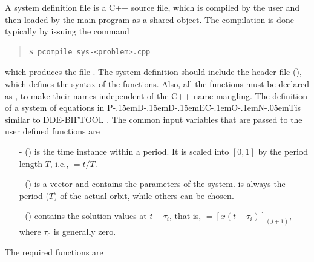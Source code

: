 \documentclass[10pt,a4paper]{ddedoc}
\def\pdde{{P\kern-.15emD\kern-.15emD\kern-.15emE\raisebox{.25ex}{-}C\kern-.1emO\kern-.1emN\kern-.05emT}}
\begin{document}
A system definition file is a C++ source file, which is compiled by the user
and then loaded by the main program  as a shared object. The compilation is
done typically by issuing the command
{ \small \begin{quote} \begin{lstlisting}[basicstyle=\tt,frame=single]
$ pcompile sys-<problem>.cpp
\end{lstlisting} \end{quote} } \noindent
which produces the file .
The system definition should include the header file  (), which defines the syntax of the functions. Also, all the functions must be declared as , to make their names independent of the C++ name mangling. The definition of a system of equations in \pdde is similar to DDE-BIFTOOL \cite{DDEBIF}. The common input variables that are passed to the user defined functions are
\begin{itemize}
  \item[-]  () is the time instance within a period. It is
  scaled into $[ 0, 1 ]$ by the period length $T$, i.e., $ = t/T$.
  \item[-]  () is a vector and contains the parameters of
  the system.  is always the period ($T$) of the actual orbit,
  while others can be chosen.
  \item[-]  () contains the solution values at $t -
  \tau_i$, that is, $= [ x ( t - \tau_i ) ]_{(j+1)}$, where $\tau_0$ is generally zero.
\end{itemize}
The required functions are
\end{document}
